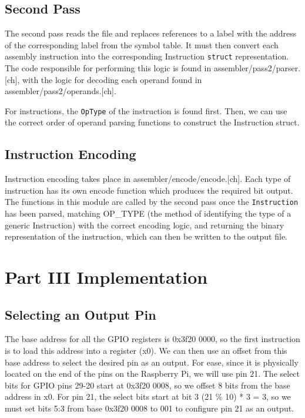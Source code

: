 \documentclass[11pt]{article}
\begin{document}
\subsection{Second Pass}

The second pass reads the file and replaces references to a label with the address of the corresponding label from the symbol table. It must then convert each assembly instruction into the corresponding Instruction \texttt{struct} representation. The code responsible for performing this logic is found in assembler/pass2/parser.[ch], with the logic for decoding each operand found in assembler/pass2/operands.[ch].

For instructions, the \texttt{OpType} of the instruction is found first. Then, we can use the correct order of operand parsing functions to construct the Instruction struct.

\subsection{Instruction Encoding}

Instruction encoding takes place in assembler/encode/encode.[ch]. Each type of instruction has its own encode function which produces the required bit output. The functions in this module are called by the second pass once the \texttt{Instruction} has been parsed, matching OP\_TYPE (the method of identifying the type of a generic Instruction) with the correct encoding logic, and returning the binary representation of the instruction, which can then be written to the output file. 

\section{Part III Implementation}

\subsection{Selecting an Output Pin}

The base address for all the GPIO registers is 0x3f20 0000, so the first instruction is to load this address into a register (x0). We can then use an offset from this base address to select the desired pin as an output. For ease, since it is physically located on the end of the pins on the Raspberry Pi, we will use pin 21.
The select bits for GPIO pins 29-20 start at 0x3f20 0008, so we offset 8 bits from the base address in x0. For pin 21, the select bits start at bit 3 (21 \% 10) * 3 = 3, so we must set bits 5:3 from base 0x3f20 0008 to 001 to configure pin 21 as an output.
\end{document}
